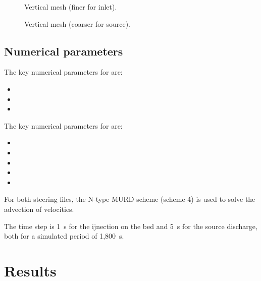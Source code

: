 \begin{figure}[H]
 \centering
  \caption{Vertical mesh (finer for inlet).}\label{fig:bottom_bc:MeshVinlet}
\end{figure}

\begin{figure}[H]
 \centering
  \caption{Vertical mesh (coarser for source).}\label{fig:bottom_bc:MeshVsource}
\end{figure}

\subsection{Numerical parameters}

The key numerical parameters for  are:

\begin{itemize}
\item {}
\item {}
\item {}
\end{itemize}

The key numerical parameters for  are:

\begin{itemize}
\item {}
\item {}
\item {}
\item {}
\item {}
\end{itemize}

For both steering files, the N-type MURD scheme (scheme 4) is used to solve the
advection of velocities.

The time step is 1~s for the ijnection on the bed and 5~s for the source
discharge, both for a simulated period of 1,800~s.

\section{Results}

